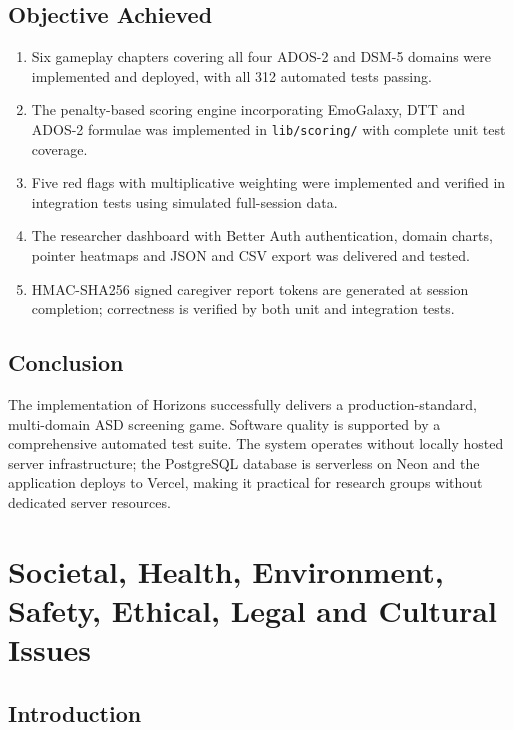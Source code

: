 \documentclass[12pt,a4paper,oneside]{report}
\begin{document}
	\section{Objective Achieved}
	
	\begin{enumerate}[leftmargin=0.5in, label=\arabic*.]
		\item Six gameplay chapters covering all four ADOS-2 and DSM-5 domains were implemented and deployed, with all 312 automated tests passing.
		\item The penalty-based scoring engine incorporating EmoGalaxy, DTT and ADOS-2 formulae was implemented in \texttt{lib/scoring/} with complete unit test coverage.
		\item Five red flags with multiplicative weighting were implemented and verified in integration tests using simulated full-session data.
		\item The researcher dashboard with Better Auth authentication, domain charts, pointer heatmaps and JSON and CSV export was delivered and tested.
		\item HMAC-SHA256 signed caregiver report tokens are generated at session completion; correctness is verified by both unit and integration tests.
	\end{enumerate}
	
	\section{Conclusion}
	
	The implementation of Horizons successfully delivers a production-standard, multi-domain ASD screening game. Software quality is supported by a comprehensive automated test suite. The system operates without locally hosted server infrastructure; the PostgreSQL database is serverless on Neon and the application deploys to Vercel, making it practical for research groups without dedicated server resources.
	
	\clearpage
	\chapter{Societal, Health, Environment, Safety, Ethical, Legal and Cultural Issues}
	
	\section{Introduction}
	
\end{document}
